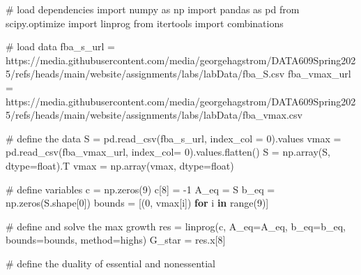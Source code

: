 \documentclass[
  letterpaper,
  DIV=11,
  numbers=noendperiod]{scrartcl}
\newenvironment{Shaded}{\begin{snugshade}}{\end{snugshade}}
\newcommand{\BuiltInTok}[1]{\textcolor[rgb]{0.00,0.23,0.31}{#1}}
\newcommand{\CommentTok}[1]{\textcolor[rgb]{0.37,0.37,0.37}{#1}}
\newcommand{\ControlFlowTok}[1]{\textcolor[rgb]{0.00,0.23,0.31}{\textbf{#1}}}
\newcommand{\DecValTok}[1]{\textcolor[rgb]{0.68,0.00,0.00}{#1}}
\newcommand{\ImportTok}[1]{\textcolor[rgb]{0.00,0.46,0.62}{#1}}
\newcommand{\KeywordTok}[1]{\textcolor[rgb]{0.00,0.23,0.31}{\textbf{#1}}}
\newcommand{\NormalTok}[1]{\textcolor[rgb]{0.00,0.23,0.31}{#1}}
\newcommand{\OperatorTok}[1]{\textcolor[rgb]{0.37,0.37,0.37}{#1}}
\newcommand{\StringTok}[1]{\textcolor[rgb]{0.13,0.47,0.30}{#1}}
\begin{document}
\begin{Shaded}
\begin{Highlighting}[]
\CommentTok{\# load dependencies}
\ImportTok{import}\NormalTok{ numpy }\ImportTok{as}\NormalTok{ np}
\ImportTok{import}\NormalTok{ pandas }\ImportTok{as}\NormalTok{ pd}
\ImportTok{from}\NormalTok{ scipy.optimize }\ImportTok{import}\NormalTok{ linprog}
\ImportTok{from}\NormalTok{ itertools }\ImportTok{import}\NormalTok{ combinations}

\CommentTok{\# load data}
\NormalTok{fba\_s\_url }\OperatorTok{=} \StringTok{\textquotesingle{}https://media.githubusercontent.com/media/georgehagstrom/DATA609Spring2025/refs/heads/main/website/assignments/labs/labData/fba\_S.csv\textquotesingle{}}
\NormalTok{fba\_vmax\_url }\OperatorTok{=} \StringTok{\textquotesingle{}https://media.githubusercontent.com/media/georgehagstrom/DATA609Spring2025/refs/heads/main/website/assignments/labs/labData/fba\_vmax.csv\textquotesingle{}}

\CommentTok{\# define the data}
\NormalTok{S }\OperatorTok{=}\NormalTok{ pd.read\_csv(fba\_s\_url, index\_col }\OperatorTok{=} \DecValTok{0}\NormalTok{).values}
\NormalTok{vmax }\OperatorTok{=}\NormalTok{ pd.read\_csv(fba\_vmax\_url, index\_col}\OperatorTok{=} \DecValTok{0}\NormalTok{).values.flatten()}
\NormalTok{S }\OperatorTok{=}\NormalTok{ np.array(S, dtype}\OperatorTok{=}\BuiltInTok{float}\NormalTok{).T}
\NormalTok{vmax }\OperatorTok{=}\NormalTok{ np.array(vmax, dtype}\OperatorTok{=}\BuiltInTok{float}\NormalTok{)}

\CommentTok{\# define variables}
\NormalTok{c }\OperatorTok{=}\NormalTok{ np.zeros(}\DecValTok{9}\NormalTok{)}
\NormalTok{c[}\DecValTok{8}\NormalTok{] }\OperatorTok{=} \OperatorTok{{-}}\DecValTok{1}  
\NormalTok{A\_eq }\OperatorTok{=}\NormalTok{ S}
\NormalTok{b\_eq }\OperatorTok{=}\NormalTok{ np.zeros(S.shape[}\DecValTok{0}\NormalTok{])}
\NormalTok{bounds }\OperatorTok{=}\NormalTok{ [(}\DecValTok{0}\NormalTok{, vmax[i]) }\ControlFlowTok{for}\NormalTok{ i }\KeywordTok{in} \BuiltInTok{range}\NormalTok{(}\DecValTok{9}\NormalTok{)]}

\CommentTok{\# define and solve the max growth}
\NormalTok{res }\OperatorTok{=}\NormalTok{ linprog(c, A\_eq}\OperatorTok{=}\NormalTok{A\_eq, b\_eq}\OperatorTok{=}\NormalTok{b\_eq, bounds}\OperatorTok{=}\NormalTok{bounds, method}\OperatorTok{=}\StringTok{\textquotesingle{}highs\textquotesingle{}}\NormalTok{)}
\NormalTok{G\_star }\OperatorTok{=}\NormalTok{ res.x[}\DecValTok{8}\NormalTok{]}

\CommentTok{\# define the duality of essential and nonessential}


\end{Highlighting}
\end{Shaded}
\end{document}
